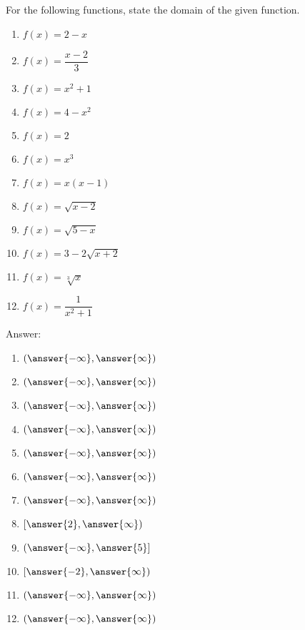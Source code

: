 \documentclass{ximera}
\author{Carl Stitz \and Jeff Zeager \and Bart Snapp \and Matthew Carr}
\begin{document}
\begin{exercise}



For the following functions, state the domain of the given function.
\begin{enumerate}
\item $f(x) = 2-x$
\item $f(x) = \dfrac{x - 2}{3}$
\item $f(x) = x^2 + 1$
\item $f(x) = 4-x^2$
\item $f(x) = 2$
\item $f(x) = x^3$
\item $f(x) = x(x-1)$
\item $f(x) = \sqrt{x-2}$
\item $f(x) = \sqrt{5 - x}$
\item $f(x) = 3-2\sqrt{x+2}$
\item $f(x) = \sqrt[3]{x}$
\item $f(x) = \dfrac{1}{x^{2} + 1}$
\end{enumerate}

Answer:
\begin{enumerate}
  \item $(\answer{-\infty},\answer{\infty})$
  \item $(\answer{-\infty},\answer{\infty})$
  \item $(\answer{-\infty},\answer{\infty})$
  \item $(\answer{-\infty},\answer{\infty})$
  \item $(\answer{-\infty},\answer{\infty})$
  \item $(\answer{-\infty},\answer{\infty})$
  \item $(\answer{-\infty},\answer{\infty})$
  \item $[\answer{2},\answer{\infty})$
  \item $(\answer{-\infty},\answer{5}]$
  \item $[\answer{-2},\answer{\infty})$
  \item $(\answer{-\infty},\answer{\infty})$
  \item $(\answer{-\infty},\answer{\infty})$
\end{enumerate}

\end{exercise}
\end{document}
